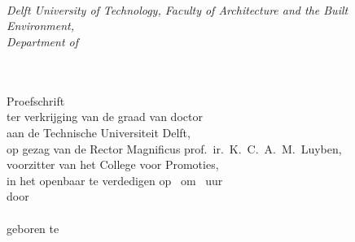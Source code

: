 \documentclass{abe}
\begin{document}
\frontmatter

\cleardoublepage%
\noindent
\begin{flushleft}
{\Huge \abethesisthetitle}\\\vspace{13pt}
{\LARGE\bfseries \abethesisthesubtitle}\\\vspace{13pt}
\vspace{39pt}{\abeauthorthename\ \abeauthorthesurname}\\
{\itshape%
Delft University of Technology, Faculty of Architecture and the Built Environment,\\Department of \abeauthorthedepartment\/}
\end{flushleft}

\cleardoublepage%
\begin{center}
{\Huge \abethesisthetitle}\\\vspace{13pt}
{\LARGE\bfseries \abethesisthesubtitle}\\\vspace{13pt}
\vfill
Proefschrift\\
\medskip
{ter verkrijging van de graad van doctor \\
aan de Technische Universiteit Delft, \\
op gezag van de Rector Magnificus prof.~ir.~K.~C.~A.~M.~Luyben, \\
voorzitter van het College voor Promoties, \\
in het openbaar te verdedigen op \abedefencethedate\ om \abedefencethetime\ uur \\
door \abeauthorthename\ \MakeUppercase{\abeauthorthesurname} \\
\abeauthorthetitle\\
geboren te \abeauthortheplaceofbirth%
}
\end{center}
\end{document}
